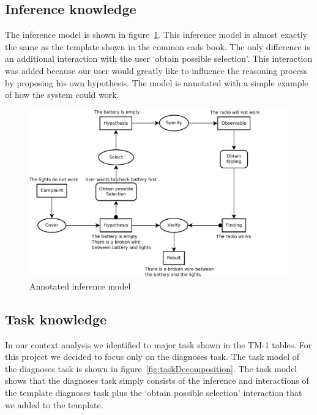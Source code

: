 \documentclass[a4paper,10pt]{article}
\begin{document}
\subsection{Inference knowledge}
The inference model is shown in figure~\ref{fig:InferenceModel}. This inference model is almost exactly the same as the template shown in the common cads book. The only difference is an additional interaction with the user `obtain possible selection'. This interaction was added because our user would greatly like to influence the reasoning process by proposing his own hypothesis. The model is annotated with a simple example of how the system could work.

\begin{figure}[htbp]
	\centering
		\includegraphics[width=1.00\textwidth]{inferenceModel.pdf}
	\caption{Annotated inference model}
	\label{fig:InferenceModel}
\end{figure}


\subsection{Task knowledge}
In our context analysis we identified to major task shown in the TM-1 tables. For this project we decided to focus only on the diagnoses task. The task model of the diagnoses task is shown in figure~\ref{fig:taskDecomposition}. The task model shows that the diagnoses task simply consists of the inference and interactions of the template diagnoses task plus the `obtain possible selection' interaction that we added to the template.
\end{document}
